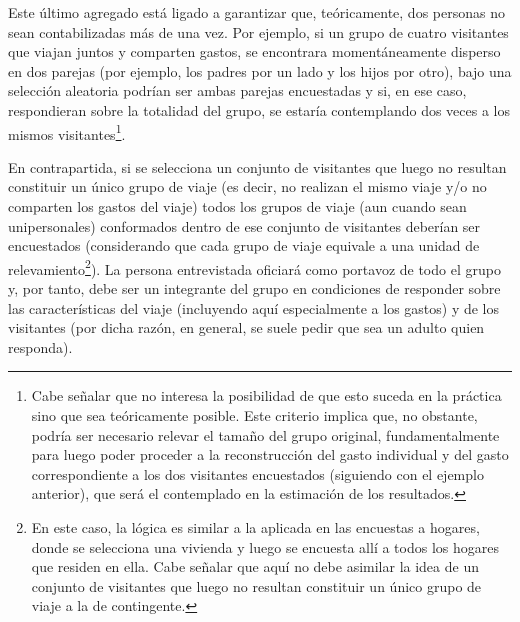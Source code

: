 \documentclass[
]{book}
\begin{document}
Este último agregado está ligado a garantizar que, teóricamente, dos personas no sean contabilizadas más de una vez. Por ejemplo, si un grupo de cuatro visitantes que viajan juntos y comparten gastos, se encontrara momentáneamente disperso en dos parejas (por ejemplo, los padres por un lado y los hijos por otro), bajo una selección aleatoria podrían ser ambas parejas encuestadas y si, en ese caso, respondieran sobre la totalidad del grupo, se estaría contemplando dos veces a los mismos visitantes\footnote{Cabe señalar que no interesa la posibilidad de que esto suceda en la práctica sino que sea teóricamente posible. Este criterio implica que, no obstante, podría ser necesario relevar el tamaño del grupo original, fundamentalmente para luego poder proceder a la reconstrucción del gasto individual y del gasto correspondiente a los dos visitantes encuestados (siguiendo con el ejemplo anterior), que será el contemplado en la estimación de los resultados.}.

En contrapartida, si se selecciona un conjunto de visitantes que luego no resultan constituir un único grupo de viaje (es decir, no realizan el mismo viaje y/o no comparten los gastos del viaje) todos los grupos de viaje (aun cuando sean unipersonales) conformados dentro de ese conjunto de visitantes deberían ser encuestados (considerando que cada grupo de viaje equivale a una unidad de relevamiento\footnote{En este caso, la lógica es similar a la aplicada en las encuestas a hogares, donde se selecciona una vivienda y luego se encuesta allí a todos los hogares que residen en ella. Cabe señalar que aquí no debe asimilar la idea de un conjunto de visitantes que luego no resultan constituir un único grupo de viaje a la de contingente.}). La persona entrevistada oficiará como portavoz de todo el grupo y, por tanto, debe ser un integrante del grupo en condiciones de responder sobre las características del viaje (incluyendo aquí especialmente a los gastos) y de los visitantes (por dicha razón, en general, se suele pedir que sea un adulto quien responda).
\end{document}
